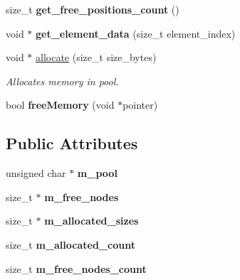 \begin{DoxyCompactItemize}
size\+\_\+t {\bfseries get\+\_\+free\+\_\+positions\+\_\+count} ()
\item 
\mbox{\label{classbtGenericMemoryPool_aab43c7fd24932f6a1e8b593672df6008}} 
void $\ast$ {\bfseries get\+\_\+element\+\_\+data} (size\+\_\+t element\+\_\+index)
\item 
void $\ast$ \hyperlink{classbtGenericMemoryPool_aa582a92d2bae1a7b158c70e144d6cff9}{allocate} (size\+\_\+t size\+\_\+bytes)
\begin{DoxyCompactList}\small\item\em Allocates memory in pool. \end{DoxyCompactList}\item 
\mbox{\label{classbtGenericMemoryPool_a5102aa7ec9a967db95ea1cb12fcb1e12}} 
bool {\bfseries free\+Memory} (void $\ast$pointer)
\end{DoxyCompactItemize}
\subsection*{Public Attributes}
\begin{DoxyCompactItemize}
\item 
\mbox{\label{classbtGenericMemoryPool_a1536341d492fc72dcbc7bd6f7043ba9b}} 
unsigned char $\ast$ {\bfseries m\+\_\+pool}
\item 
\mbox{\label{classbtGenericMemoryPool_a0b81f85d027c51c6995ea496bf52e487}} 
size\+\_\+t $\ast$ {\bfseries m\+\_\+free\+\_\+nodes}
\item 
\mbox{\label{classbtGenericMemoryPool_ae2732d0fb4541dc103e1bafda022348d}} 
size\+\_\+t $\ast$ {\bfseries m\+\_\+allocated\+\_\+sizes}
\item 
\mbox{\label{classbtGenericMemoryPool_a50e413558ea538bf216c17e54ea2109c}} 
size\+\_\+t {\bfseries m\+\_\+allocated\+\_\+count}
\item 
\mbox{\label{classbtGenericMemoryPool_a08cf9f80b12fc0cda7e8ea259ad8a3dc}} 
size\+\_\+t {\bfseries m\+\_\+free\+\_\+nodes\+\_\+count}
\end{DoxyCompactItemize}
